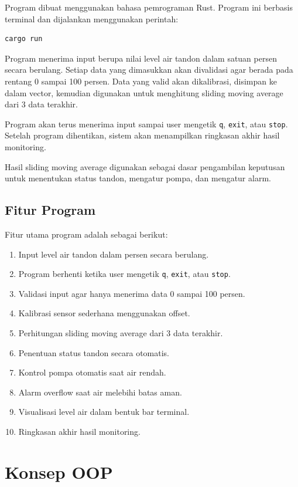 \documentclass[12pt,a4paper]{article}
\begin{document}
Program dibuat menggunakan bahasa pemrograman Rust. Program ini berbasis terminal dan dijalankan menggunakan perintah:

\begin{lstlisting}
cargo run
\end{lstlisting}

Program menerima input berupa nilai level air tandon dalam satuan persen secara berulang. Setiap data yang dimasukkan akan divalidasi agar berada pada rentang 0 sampai 100 persen. Data yang valid akan dikalibrasi, disimpan ke dalam vector, kemudian digunakan untuk menghitung sliding moving average dari 3 data terakhir.

Program akan terus menerima input sampai user mengetik \texttt{q}, \texttt{exit}, atau \texttt{stop}. Setelah program dihentikan, sistem akan menampilkan ringkasan akhir hasil monitoring.

Hasil sliding moving average digunakan sebagai dasar pengambilan keputusan untuk menentukan status tandon, mengatur pompa, dan mengatur alarm.

\subsection{Fitur Program}

Fitur utama program adalah sebagai berikut:

\begin{enumerate}
    \item Input level air tandon dalam persen secara berulang.
    \item Program berhenti ketika user mengetik \texttt{q}, \texttt{exit}, atau \texttt{stop}.
    \item Validasi input agar hanya menerima data 0 sampai 100 persen.
    \item Kalibrasi sensor sederhana menggunakan offset.
    \item Perhitungan sliding moving average dari 3 data terakhir.
    \item Penentuan status tandon secara otomatis.
    \item Kontrol pompa otomatis saat air rendah.
    \item Alarm overflow saat air melebihi batas aman.
    \item Visualisasi level air dalam bentuk bar terminal.
    \item Ringkasan akhir hasil monitoring.
\end{enumerate}

\section{Konsep OOP}
\end{document}
